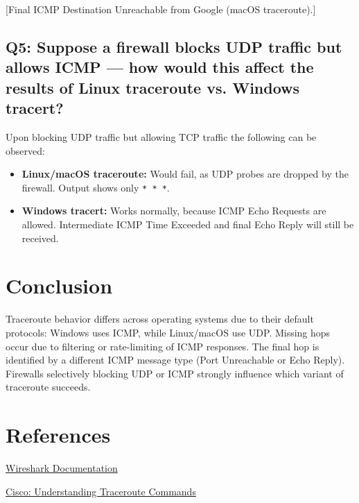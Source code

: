 \documentclass[10pt,a4paper]{report}
\begin{document}
[Final ICMP Destination Unreachable from Google (macOS traceroute).]

\subsection*{Q5: Suppose a firewall blocks UDP traffic but allows ICMP — how would this affect the
results of Linux traceroute vs. Windows tracert?}

Upon blocking UDP traffic but allowing TCP traffic the following can be observed:
\begin{itemize}
    \item \textbf{Linux/macOS traceroute:} Would fail, as UDP probes are dropped by the firewall. Output shows only \texttt{* * *}.  
    \item \textbf{Windows tracert:} Works normally, because ICMP Echo Requests are allowed. Intermediate ICMP Time Exceeded and final Echo Reply will still be received.  
\end{itemize}

\section{Conclusion}
Traceroute behavior differs across operating systems due to their default protocols: Windows uses ICMP, while Linux/macOS use UDP. Missing hops occur due to filtering or rate-limiting of ICMP responses. The final hop is identified by a different ICMP message type (Port Unreachable or Echo Reply). Firewalls selectively blocking UDP or ICMP strongly influence which variant of traceroute succeeds.


\section{References}
\begin{enumerate}[label={[\arabic*]}, itemsep=0.05em, topsep=0pt]
    \item \href{https://www.wireshark.org/docs/}{Wireshark Documentation}
    \item \href{https://www.cisco.com/c/en/us/support/docs/ios-nx-os-software/ios-software-releases-121-mainline/12778-ping-traceroute.html?utm_source=chatgpt.com}{Cisco: Understanding Traceroute Commands}
\end{enumerate}
\end{document}
